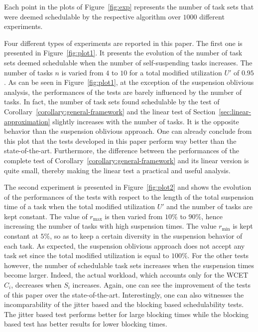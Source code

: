 Each point in the plots of Figure~\ref{fig:exp} represents the number of task sets that were deemed schedulable by the respective algorithm over $1000$ different experiments.

Four different types of experiments are reported in this paper. The first one is presented in Figure~\ref{fig:plot1}. It presents the evolution of the number of task sets deemed schedulable when the number of self-suspending tasks increases. The number of tasks $n$ is varied from $4$ to $10$ for a total modified utilization $U'$ of $0.95$. As can be seen in Figure~\ref{fig:plot1}, at the exception of the suspension oblivious analysis, the performances of the tests are barely influenced by the number of tasks. In fact, the number of task sets found schedulable by the test of Corollary~\ref{corollary:general-framework} and the linear test of Section~\ref{sec:linear-approximation} slightly increases with the number of tasks. It is the opposite behavior than the suspension oblivious approach. One can already conclude from this plot that the tests developed in this paper perform way better than the state-of-the-art. Furthermore, the difference between the performances of the complete test of Corollary~\ref{corollary:general-framework} and its linear version is quite small, thereby making the linear test a practical and useful analysis.

The second experiment is presented in Figure~\ref{fig:plot2} and shows the evolution of the performances of the tests with respect to the length of the total suspension time of a task when the total modified utilization $U'$ and the number of tasks are kept constant. The value of $r_{\max}$ is then varied from $10\%$ to $90\%$, hence increasing the number of tasks with high suspension times. The value $r_{\min}$ is kept constant at $5\%$, so as to keep a certain diversity in the suspension behavior of each task. As expected, the suspension oblivious approach does not accept any task set since the total modified utilization is equal to $100\%$. For the other tests however, the number of schedulable task sets increases when the suspension times become larger. Indeed, the actual workload, which accounts only for the WCET $C_i$, decreases when $S_i$ increases. Again, one can see the improvement of the tests of this paper over the state-of-the-art. Interestingly, one can also witnesses the incomparability of the jitter based and the blocking based schedulability tests. The jitter based test performs better for large blocking times while the blocking based test has better results for lower blocking times.

